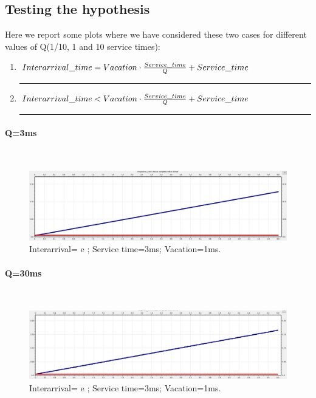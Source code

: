 \documentclass{article}
\newcommand\crule[3][black]{\textcolor{#1}{\rule{#2}{#3}}}
\begin{document}
    \subsection{Testing the hypothesis}
        Here we report some plots where we have considered these two cases for different values of Q(1/10, 1 and 10 service times):
        \begin{enumerate}
            \item $Inter\-arrival\_time = Vacation \cdot \frac{Service\_time}{Q} + Service\_time$     \crule[red]{3mm}{3mm}
            \item $Inter\-arrival\_time < Vacation \cdot \frac{Service\_time}{Q} + Service\_time$
            \crule[blue]{3mm}{3mm}
        \end{enumerate}
        
        \begin{paragraph}
        \centering
            \centering \paragraph{Q=3ms} \hfill \\
            \begin{figure}[htbp]
                \centering
                \includegraphics[scale=0.3]{./images/constant_case/3ms.jpg}
                \caption{Interarrival= {\color{blue}{3,9ms}} e {\color{red}{4ms}}; Service time=3ms; Vacation=1ms.}
                \label{fig:constant_3ms}
            \end{figure}
        \end{paragraph}
        
        \begin{paragraph}
        \centering
            \centering \paragraph{Q=30ms} \hfill \\
            \begin{figure}[htbp]
                \centering
                \includegraphics[scale=0.3]{./images/constant_case/30ms.jpg}
                \caption{Interarrival= {\color{blue}{3ms}} e {\color{red}{3,1ms}}; Service time=3ms; Vacation=1ms.}
                \label{fig:constant_30ms}
            \end{figure}
        \end{paragraph}
        
\end{document}
